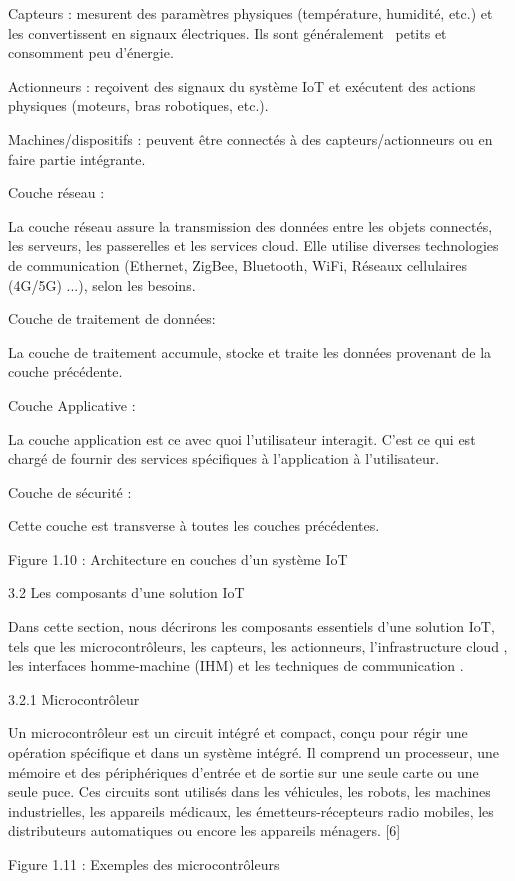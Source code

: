 \documentclass{article}
\begin{document}
Capteurs : mesurent des paramètres physiques (température, humidité, etc.) et les convertissent en signaux électriques. Ils sont généralement  petits et consomment peu d’énergie.

Actionneurs : reçoivent des signaux du système IoT et exécutent des actions physiques (moteurs, bras robotiques, etc.).

Machines/dispositifs : peuvent être connectés à des capteurs/actionneurs ou en faire partie intégrante.

Couche réseau :

La couche réseau assure la transmission des données entre les objets connectés, les serveurs, les passerelles et les services cloud. Elle utilise diverses technologies de communication (Ethernet, ZigBee, Bluetooth, WiFi, Réseaux cellulaires (4G/5G) ...), selon les besoins.

Couche de traitement de données:

La couche de traitement accumule, stocke et traite les données provenant de la couche précédente. 

Couche Applicative :

La couche application est ce avec quoi l’utilisateur interagit. C’est ce qui est chargé de fournir des services spécifiques à l’application à l’utilisateur.

Couche de sécurité :

Cette couche est transverse à toutes les couches précédentes.

Figure 1.10 : Architecture en couches d’un système IoT

3.2 Les composants d’une solution IoT

Dans cette section, nous décrirons les composants essentiels d'une solution IoT, tels que les microcontrôleurs, les capteurs, les actionneurs, l’infrastructure cloud , les interfaces homme-machine (IHM) et les techniques de communication .

3.2.1 Microcontrôleur

Un microcontrôleur est un circuit intégré et compact, conçu pour régir une opération spécifique et dans un système intégré. Il comprend un processeur, une mémoire et des périphériques d’entrée et de sortie sur une seule carte ou une seule puce. Ces circuits sont utilisés dans les véhicules, les robots, les machines industrielles, les appareils médicaux, les émetteurs-récepteurs radio mobiles, les distributeurs automatiques ou encore les appareils ménagers. [6]

Figure 1.11 : Exemples des microcontrôleurs
\end{document}
